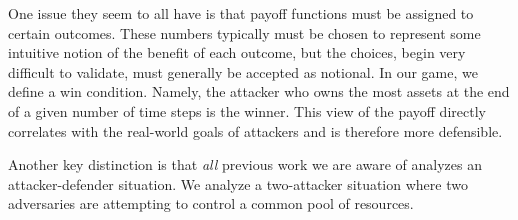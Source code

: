 One issue they seem to all have is that payoff functions must be
assigned to certain outcomes. These numbers typically must be chosen
to represent some intuitive notion of the benefit of each outcome, but
the choices, begin very difficult to validate, must generally be
accepted as notional. In our game, we define a win condition. Namely,
the attacker who owns the most assets at the end of a given number of
time steps is the winner. This view of the payoff directly correlates
with the real-world goals of attackers and is therefore more
defensible.

Another key distinction is that {\em all} previous work we are aware
of analyzes an attacker-defender situation. We analyze a two-attacker
situation where two adversaries are attempting to control a common
pool of resources.
